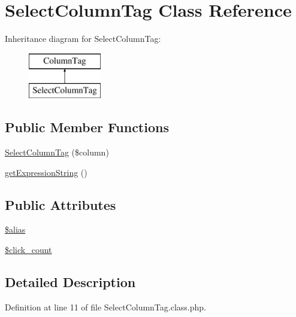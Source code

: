 \hypertarget{classSelectColumnTag}{\section{Select\+Column\+Tag Class Reference}
\label{classSelectColumnTag}
}
Inheritance diagram for Select\+Column\+Tag\+:\begin{figure}[H]
\begin{center}
\leavevmode
\includegraphics[height=2.000000cm]{classSelectColumnTag}
\end{center}
\end{figure}
\subsection*{Public Member Functions}
\begin{DoxyCompactItemize}
\item 
\hyperlink{classSelectColumnTag_a05e82794cb692f0af9a7da2eb41a229d}{Select\+Column\+Tag} (\$column)
\item 
\hyperlink{classSelectColumnTag_a4e4b646d742cb51b7c72f0d953717e3a}{get\+Expression\+String} ()
\end{DoxyCompactItemize}
\subsection*{Public Attributes}
\begin{DoxyCompactItemize}
\item 
\hyperlink{classSelectColumnTag_a152fca9e152d65e4697ad823ffaa101b}{\$alias}
\item 
\hyperlink{classSelectColumnTag_a5965b8a6c68685c6b99dd88f4fd87f52}{\$click\+\_\+count}
\end{DoxyCompactItemize}


\subsection{Detailed Description}


Definition at line 11 of file Select\+Column\+Tag.\+class.\+php.



